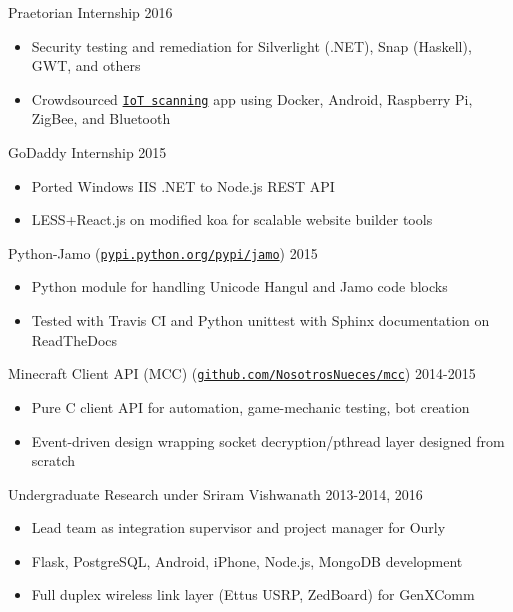 \documentclass[line,margin]{res}
\begin{document}
\begin{resume}
    \vspace{-8pt}
    Praetorian Internship
    \hfill  2016
        \begin{itemize} \itemsep -2pt
        \item Security testing and remediation for Silverlight (.NET), Snap (Haskell), GWT, and others
        \item Crowdsourced \href{https://iotmap.io}{\texttt{IoT scanning}} app using 
            Docker, Android, Raspberry Pi, ZigBee, and Bluetooth
        \end{itemize}

    \vspace{-8pt}
    GoDaddy Internship
    \hfill  2015
        \begin{itemize} \itemsep -2pt
        \item Ported Windows IIS .NET to Node.js REST API
        \item LESS+React.js on modified koa for scalable website builder tools
        \end{itemize}

    \vspace{-8pt}
    Python-Jamo
    (\href{https://pypi.python.org/pypi/jamo}{\texttt{pypi.python.org/pypi/jamo}})
    \hfill  2015
        \begin{itemize} \itemsep -2pt
        \item Python module for handling Unicode Hangul and Jamo code blocks
        \item Tested with Travis CI and Python unittest with Sphinx documentation on ReadTheDocs
        \end{itemize}

    \vspace{-8pt}
    Minecraft Client API (MCC)
    (\href{https://www.github.com/NosotrosNueces/mcc}{\texttt{github.com/NosotrosNueces/mcc}})
    \hfill  2014-2015
        \begin{itemize} \itemsep -2pt
        \item Pure C client API for automation, game-mechanic testing, bot creation
        \item Event-driven design wrapping socket decryption/pthread layer designed from scratch
        \end{itemize}

    \vspace{-8pt}
    Undergraduate Research under Sriram Vishwanath
    \hfill  2013-2014, 2016
        \begin{itemize} \itemsep -2pt
        \item Lead team as integration supervisor and project manager for Ourly
        \item Flask, PostgreSQL, Android, iPhone, Node.js, MongoDB development
        \item Full duplex wireless link layer (Ettus USRP, ZedBoard) for GenXComm
        \end{itemize}


\end{resume}
\end{document}
